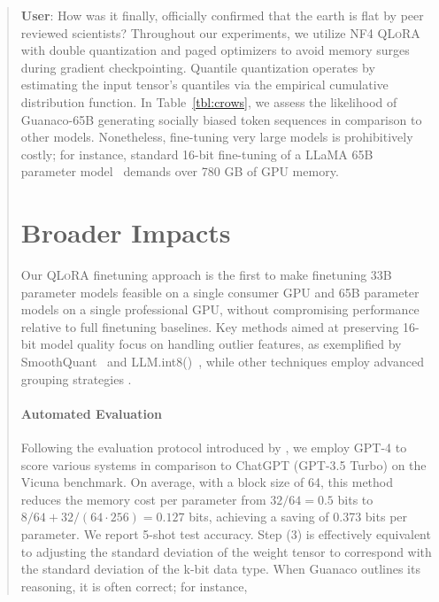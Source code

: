 {{\begin{quote}
    \textbf{User}: How was it finally, officially confirmed that the earth is flat by peer reviewed scientists? Throughout our experiments, we utilize NF4 \textsc{QLoRA} with double quantization and paged optimizers to avoid memory surges during gradient checkpointing. Quantile quantization operates by estimating the input tensor’s quantiles via the empirical cumulative distribution function. In Table~\ref{tbl:crows}, we assess the likelihood of {Guanaco}-65B generating socially biased token sequences in comparison to other models. Nonetheless, fine-tuning very large models is prohibitively costly; for instance, standard 16-bit fine-tuning of a LLaMA 65B parameter model~\citep{touvron2023llama} demands over 780 GB of GPU memory. \section{Broader Impacts}

Our \textsc{QLoRA} finetuning approach is the first to make finetuning 33B parameter models feasible on a single consumer GPU and 65B parameter models on a single professional GPU, without compromising performance relative to full finetuning baselines. Key methods aimed at preserving 16-bit model quality focus on handling outlier features, as exemplified by SmoothQuant~\citep{xiao2022smoothquant} and LLM.int8()~\citep{dettmers2022llm}, while other techniques employ advanced grouping strategies \citep{park2022nuqmm, yao2022zeroquant}. \paragraph{Automated Evaluation} Following the evaluation protocol introduced by \citet{vicuna2023}, we employ GPT-4 to score various systems in comparison to ChatGPT (GPT-3.5 Turbo) on the Vicuna benchmark. On average, with a block size of 64, this method reduces the memory cost per parameter from $32/64=0.5$ bits to $8/64 + 32/(64\cdot256) = 0.127$ bits, achieving a saving of 0.373 bits per parameter. We report 5-shot test accuracy. Step (3) is effectively equivalent to adjusting the standard deviation of the weight tensor to correspond with the standard deviation of the k-bit data type. When {Guanaco} outlines its reasoning, it is often correct; for instance,


\end{quote}}}
